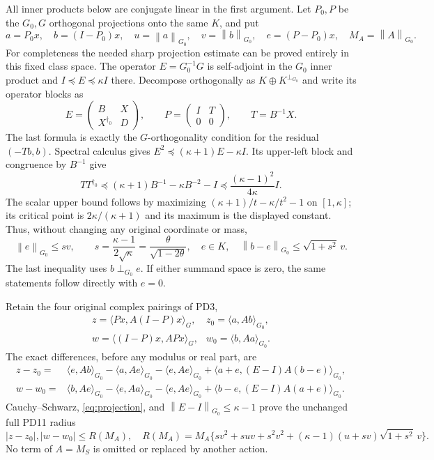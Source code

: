 \documentclass[11pt]{article}
\newcommand{\norm}[1]{\left\lVert#1\right\rVert}
\begin{document}
All inner products below are conjugate linear in the first
argument. Let $P_0,P$ be the $G_0,G$ orthogonal projections
onto the same $K$, and put
\[
 a=P_0x,\quad b=(I-P_0)x,\quad
 u=\norm{a}_{G_0},\quad v=\norm{b}_{G_0},\quad
 e=(P-P_0)x,\quad M_A=\norm{A}_{G_0}.
\]
For completeness the needed sharp projection estimate can be
proved entirely in this fixed class space. The operator
$E=G_0^{-1}G$ is self-adjoint in the $G_0$ inner product and
$I\preceq E\preceq\kappa I$ there. Decompose orthogonally as
$K\oplus K^{\perp_{G_0}}$ and write its operator blocks as
\[
 E=\begin{pmatrix}B&X\\X^{\dagger_0}&D\end{pmatrix},\qquad
 P=\begin{pmatrix}I&T\\0&0\end{pmatrix},\qquad T=B^{-1}X.
\]
The last formula is exactly the $G$-orthogonality condition for
the residual $(-Tb,b)$. Spectral calculus gives
$E^2\preceq(\kappa+1)E-\kappa I$. Its upper-left block and
congruence by $B^{-1}$ give
\[
 TT^{\dagger_0}\preceq(\kappa+1)B^{-1}-\kappa B^{-2}-I
 \preceq\frac{(\kappa-1)^2}{4\kappa}I.
\]
The scalar upper bound follows by maximizing
$(\kappa+1)/t-\kappa/t^2-1$ on $[1,\kappa]$; its critical
point is $2\kappa/(\kappa+1)$ and its maximum is the displayed
constant. Thus, without changing any original coordinate or mass,
\begin{equation}\tag{MC8}\label{eq:projection}
 \norm{e}_{G_0}\le sv,\qquad
 s=\frac{\kappa-1}{2\sqrt\kappa}
   =\frac{\theta}{\sqrt{1-2\theta}},\quad e\in K,
 \quad\norm{b-e}_{G_0}\le\sqrt{1+s^2}\,v.
\end{equation}
The last inequality uses $b\perp_{G_0}e$. If either summand
space is zero, the same statements follow directly with $e=0$.

Retain the four original complex pairings of PD3,
\begin{equation}\tag{MC9}\label{eq:pairings}
 \begin{array}{ll}
 z=\langle Px,A(I-P)x\rangle_G,&z_0=\langle a,Ab\rangle_{G_0},\\
 w=\langle(I-P)x,APx\rangle_G,&w_0=\langle b,Aa\rangle_{G_0}.
 \end{array}
\end{equation}
The exact differences, before any modulus or real part, are
\[
\begin{split}
 z-z_0={}&\langle e,Ab\rangle_{G_0}-\langle a,Ae\rangle_{G_0}
          -\langle e,Ae\rangle_{G_0}
          +\langle a+e,(E-I)A(b-e)\rangle_{G_0},\\
 w-w_0={}&\langle b,Ae\rangle_{G_0}-\langle e,Aa\rangle_{G_0}
          -\langle e,Ae\rangle_{G_0}
          +\langle b-e,(E-I)A(a+e)\rangle_{G_0}.
\end{split}
\]
Cauchy--Schwarz, \eqref{eq:projection}, and
$\norm{E-I}_{G_0}\le\kappa-1$ prove the unchanged full PD11
radius
\begin{equation}\tag{MC10}\label{eq:radius}
 |z-z_0|,|w-w_0|\le R(M_A),\quad
 R(M_A)=M_A\{sv^2+suv+s^2v^2
              +(\kappa-1)(u+sv)\sqrt{1+s^2}\,v\}.
\end{equation}
No term of $A=M_S$ is omitted or replaced by another action.
\end{document}
